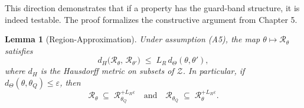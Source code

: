 \documentclass[12pt]{article}
\theoremstyle{definition}
\theoremstyle{plain}
\newtheorem{lemma}{Lemma}[section]
\begin{document}
This direction demonstrates that if a property has the guard-band structure, it is indeed testable. The proof formalizes the constructive argument from Chapter 5.

\begin{lemma}[Region-Approximation]
\label{lem:region_approx}
Under assumption (A5), the map \(\theta\mapsto\mathcal R_\theta\) satisfies
\[
  d_H\bigl(\mathcal R_{\theta},\,\mathcal R_{\theta'}\bigr)
  \;\le\;L_R\,d_\Theta(\theta,\theta'),
\]
where \(d_H\) is the Hausdorff metric on subsets of \(\mathcal Z\).  In particular, if 
\(d_\Theta(\theta,\theta_Q)\le\varepsilon\), then
\[
  \mathcal R_{\theta}\;\subseteq\;\mathcal R_{\theta_Q}^{+L_R\varepsilon}
  \quad\text{and}\quad
  \mathcal R_{\theta_Q}\;\subseteq\;\mathcal R_{\theta}^{+L_R\varepsilon}.
\]
\end{lemma}
\end{document}
